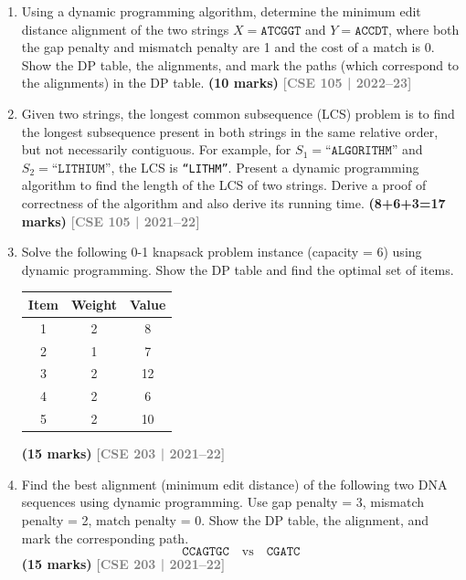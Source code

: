 \documentclass[12pt,a3paper]{article}
\newcommand{\yr}[1]{\hfill\textcolor{gray}{\small\textbf{[#1]}}}
\newcommand{\mk}[1]{\textcolor{orange!70!black}{\small\textbf{(#1 marks)}}}
\begin{document}
\begin{enumerate}

\item Using a dynamic programming algorithm, determine the minimum edit distance alignment of the two strings $X = \texttt{ATCGGT}$ and $Y = \texttt{ACCDT}$, where both the gap penalty and mismatch penalty are 1 and the cost of a match is 0. Show the DP table, the alignments, and mark the paths (which correspond to the alignments) in the DP table. \mk{10}
\yr{CSE 105 | 2022--23}

\item Given two strings, the longest common subsequence (LCS) problem is to find the longest subsequence present in both strings in the same relative order, but not necessarily contiguous. For example, for $S_1 = \texttt{``ALGORITHM''}$ and $S_2 = \texttt{``LITHIUM''}$, the LCS is \texttt{``LITHM''}. Present a dynamic programming algorithm to find the length of the LCS of two strings. Derive a proof of correctness of the algorithm and also derive its running time. \mk{8+6+3=17}
\yr{CSE 105 | 2021--22}


\item Solve the following 0-1 knapsack problem instance (capacity = 6) using dynamic programming. Show the DP table and find the optimal set of items.
\begin{center}
\begin{tabular}{ccc}
\toprule
Item & Weight & Value \\
\midrule
1 & 2 & 8 \\
2 & 1 & 7 \\
3 & 2 & 12 \\
4 & 2 & 6 \\
5 & 2 & 10 \\
\bottomrule
\end{tabular}
\end{center}
\mk{15}
\yr{CSE 203 | 2021--22}


\item Find the best alignment (minimum edit distance) of the following two DNA sequences using dynamic programming. Use gap penalty = 3, mismatch penalty = 2, match penalty = 0. Show the DP table, the alignment, and mark the corresponding path.
\[ \texttt{CCAGTGC} \quad \text{vs} \quad \texttt{CGATC} \]
\mk{15}
\yr{CSE 203 | 2021--22}


\end{enumerate}
\end{document}
